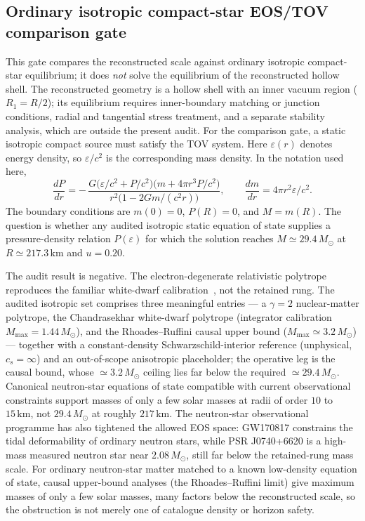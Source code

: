\documentclass[11pt,a4paper]{article}
\begin{document}
\subsection{Ordinary isotropic compact-star EOS/TOV comparison gate}

This gate compares the reconstructed scale against ordinary isotropic compact-star equilibrium; it does \emph{not} solve the equilibrium of the reconstructed hollow shell. The reconstructed geometry is a hollow shell with an inner vacuum region ($R_{1}=R/2$); its equilibrium requires inner-boundary matching or junction conditions, radial and tangential stress treatment, and a separate stability analysis, which are outside the present audit. For the comparison gate, a static isotropic compact source must satisfy the TOV system. Here $\varepsilon(r)$ denotes energy density, so $\varepsilon/c^{2}$ is the corresponding mass density. In the notation used here,
\[
\frac{dP}{dr}
= -\,\frac{
G\bigl(\varepsilon/c^{2}+P/c^{2}\bigr)
\bigl(m+4\pi r^{3}P/c^{2}\bigr)
}{
r^{2}\bigl(1-2Gm/(c^{2}r)\bigr)
},
\qquad
\frac{dm}{dr}
= 4\pi r^{2}\varepsilon/c^{2}.
\]
The boundary conditions are $m(0)=0$, $P(R)=0$, and $M=m(R)$. The question is whether any audited isotropic static equation of state supplies a pressure-density relation $P(\varepsilon)$ for which the solution reaches $M\simeq29.4\,M_{\odot}$ at $R\simeq217.3\,\mathrm{km}$ and $u=0.20$. \cite{Wald1984}

The audit result is negative. The electron-degenerate relativistic polytrope reproduces the familiar white-dwarf calibration~\cite{Chandrasekhar1931}, not the retained rung. The audited isotropic set comprises three meaningful entries --- a $\gamma=2$ nuclear-matter polytrope, the Chandrasekhar white-dwarf polytrope (integrator calibration $M_{\max}=1.44\,M_{\odot}$), and the Rhoades--Ruffini causal upper bound ($M_{\max}\simeq3.2\,M_{\odot}$) --- together with a constant-density Schwarzschild-interior reference (unphysical, $c_{s}=\infty$) and an out-of-scope anisotropic placeholder; the operative leg is the causal bound, whose $\simeq3.2\,M_{\odot}$ ceiling lies far below the required $\simeq29.4\,M_{\odot}$. Canonical neutron-star equations of state compatible with current observational constraints support masses of only a few solar masses at radii of order $10$ to $15\,\mathrm{km}$, not $29.4\,M_{\odot}$ at roughly $217\,\mathrm{km}$. The neutron-star observational programme has also tightened the allowed EOS space: GW170817 constrains the tidal deformability of ordinary neutron stars, while PSR J0740+6620 is a high-mass measured neutron star near $2.08\,M_{\odot}$, still far below the retained-rung mass scale. For ordinary neutron-star matter matched to a known low-density equation of state, causal upper-bound analyses (the Rhoades--Ruffini limit) give maximum masses of only a few solar masses, many factors below the reconstructed scale, so the obstruction is not merely one of catalogue density or horizon safety. \cite{LIGO_GW170817_2017,Fonseca2021J0740,RhoadesRuffini1974}
\end{document}
